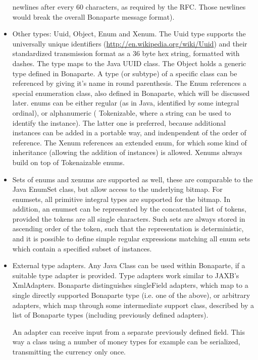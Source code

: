 \documentclass[11pt,a4paper,oneside]{article}
\begin{document}
\begin{itemize}
    newlines after every 60 characters, as required by the RFC. Those newlines would break the overall Bonaparte message format).
  \item Other types: {\ttfamily Uuid}, {\ttfamily Object}, {\ttfamily Enum} and {\ttfamily Xenum}. The
  {\ttfamily Uuid} type supports the universally unique identifiers (\url{http://en.wikipedia.org/wiki/Uuid}) and their standardized transmission format as a 36 byte hex string, formatted with dashes.
   The type maps to the Java UUID class. The {\ttfamily Object} holds a generic type defined in Bonaparte. A type (or subtype) of a specific class can be
    referenced by giving it's name in round parenthesis.
   The {\ttfamily Enum} references a special enumeration class, also defined in Bonaparte, which will be discussed later.
   {\ttfamily enum}s can be either regular (as in Java, identified by some integral ordinal), or alphanumeric ({\ttfamily
   Tokenizable}, where a string can be used to identify the instance). The latter one is preferred, because additional instances
   can be added in a portable way, and indenpendent of the order of reference. The {\ttfamily Xenum} references an extended
   enum, for which some kind of inheritance (allowing the addition of instances) is allowed. {\ttfamily Xenum}s always build on
   top of {\ttfamily Tokenaizable} {\ttfamily enum}s.
   \item Sets of enums and xenums are supported as well, these are comparable to the Java {\ttfamily EnumSet} class, but allow
   access to the underlying bitmap. For {\ttfamily enumset}s, all primitive integral types are supported for the bitmap. In
   addition, an {\ttfamily enumset} can be represented by the concatenated list of tokens, provided the tokens are all single
   characters. Such sets are always stored in ascending order of the token, such that the representation is deterministic, and
   it is possible to define simple regular expressions matching all enum sets which contain a specified subset of instances.
   \item External type adapters. Any Java Class can be used within Bonaparte, if a suitable type adapter is provided. Type
   adapters work similar to JAXB's {\ttfamily XmlAdapter}s. Bonaparte distinguishes {\ttfamily singleField} adapters, which map
   to a single directly supported Bonaparte type (i.e. one of the above), or arbitrary adapters, which map through some
   intermediate support class, described by a list of Bonaparte types (including previously defined adapters).

   An adapter can receive input from a separate previously defined field. This way a class using a number of money types for
   example can be serialized, transmitting the currency only once.
\end{itemize}
\end{document}
